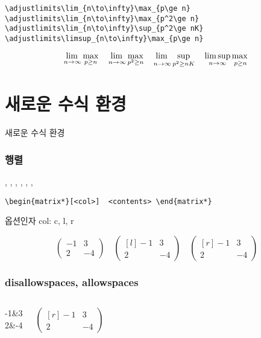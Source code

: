 \documentclass{beamer}
\begin{document}
\begin{frame}[fragile,t]
\frametitle{\texttt{\string\adjustlimits}}
\begin{verbatim}
\adjustlimits\lim_{n\to\infty}\max_{p\ge n}
\adjustlimits\lim_{n\to\infty}\max_{p^2\ge n} 
\adjustlimits\lim_{n\to\infty}\sup_{p^2\ge nK} 
\adjustlimits\limsup_{n\to\infty}\max_{p\ge n}
\end{verbatim}
\smallskip
{\Large
\[
\adjustlimits\lim_{n\to\infty}\max_{p\ge n} \quad
\adjustlimits\lim_{n\to\infty}\max_{p^2\ge n} \quad
\adjustlimits\lim_{n\to\infty}\sup_{p^2\ge nK} \quad
\adjustlimits\limsup_{n\to\infty}\max_{p\ge n}
\]
}
\end{frame}

\section{새로운 수식 환경}

\begin{frame}
\huge
\centering 새로운 수식 환경
\end{frame}

\begin{frame}[fragile, t]
\frametitle{행렬}
\texttt{\string\matrix*}, 
\texttt{\string\pmatrix*}, 
\texttt{\string\bmatrix*}, 
\texttt{\string\Bmatrix*}, 
\texttt{\string\vmatrix*}, 
\texttt{\string\Vmatrix*}, 

\begin{verbatim}
\begin{matrix*}[<col>]  <contents> \end{matrix*}
\end{verbatim}

옵션인자 col: \alert{c, l, r}

\[
\begin{pmatrix*}
-1&3\\2&-4
\end{pmatrix*}
\quad
\begin{pmatrix*}[l]
-1&3\\2&-4
\end{pmatrix*}
\quad
\begin{pmatrix*}[r]
-1&3\\2&-4
\end{pmatrix*}
\]
\vfill\vfill
\end{frame}

\begin{frame}[fragile]
\frametitle{disallowspaces, allowspaces}
\begin{columns}[c]
\column{1.5in}
\begin{Verbatim*}
\begin{pmatrix*} [r]
-1&3\\
2&-4
\end{pmatrix*}
\end{Verbatim*}
\column{1.5in}
\Large
\[
\begin{pmatrix*} [r]
-1&3\\
2&-4
\end{pmatrix*}
\]
\end{columns}
\end{frame}
\end{document}

